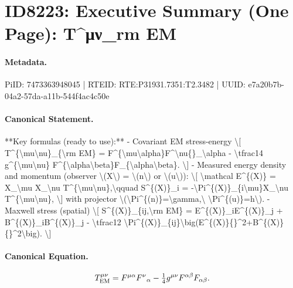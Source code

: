 \section*{ID8223: Executive Summary (One Page): T\textasciicircum{}μν\_rm EM}
\paragraph{Metadata.}
PiID: 7473363948045 | RTEID: RTE:P31931.7351:T2.3482 | UUID: e7a20b7b-04a2-57da-a11b-544f4ac4c50e

\paragraph{Canonical Statement.}
**Key formulas (ready to use):** - Covariant EM stress-energy \textbackslash{}[ T\textasciicircum{}\{\textbackslash{}mu\textbackslash{}nu\}\_\{\textbackslash{}rm EM\} = F\textasciicircum{}\{\textbackslash{}mu\textbackslash{}alpha\}F\textasciicircum{}\textbackslash{}nu\{\}\_\textbackslash{}alpha - \textbackslash{}tfrac14 g\textasciicircum{}\{\textbackslash{}mu\textbackslash{}nu\} F\textasciicircum{}\{\textbackslash{}alpha\textbackslash{}beta\}F\_\{\textbackslash{}alpha\textbackslash{}beta\}. \textbackslash{}] - Measured energy density and momentum (observer \textbackslash{}(X\textbackslash{}) = \textbackslash{}(n\textbackslash{}) or \textbackslash{}(u\textbackslash{})): \textbackslash{}[ \textbackslash{}mathcal E\textasciicircum{}\{(X)\} = X\_\textbackslash{}mu X\_\textbackslash{}nu T\textasciicircum{}\{\textbackslash{}mu\textbackslash{}nu\},\textbackslash{}qquad S\textasciicircum{}\{(X)\}\_i = -\textbackslash{}Pi\textasciicircum{}\{(X)\}\_\{i\textbackslash{}mu\}X\_\textbackslash{}nu T\textasciicircum{}\{\textbackslash{}mu\textbackslash{}nu\}, \textbackslash{}] with projector \textbackslash{}(\textbackslash{}Pi\textasciicircum{}\{(n)\}=\textbackslash{}gamma,\textbackslash{} \textbackslash{}Pi\textasciicircum{}\{(u)\}=h\textbackslash{}). - Maxwell stress (spatial) \textbackslash{}[ S\textasciicircum{}\{(X)\}\_\{ij,\textbackslash{}rm EM\} = E\textasciicircum{}\{(X)\}\_iE\textasciicircum{}\{(X)\}\_j + B\textasciicircum{}\{(X)\}\_iB\textasciicircum{}\{(X)\}\_j - \textbackslash{}tfrac12 \textbackslash{}Pi\textasciicircum{}\{(X)\}\_\{ij\}\textbackslash{}big(E\textasciicircum{}\{(X)\}\{\}\textasciicircum{}2+B\textasciicircum{}\{(X)\}\{\}\textasciicircum{}2\textbackslash{}big). \textbackslash{}]

\paragraph{Canonical Equation.}
\[
T^{\mu\nu}_{\rm EM} = F^{\mu\alpha}F^\nu{}_\alpha - \tfrac14 g^{\mu\nu} F^{\alpha\beta}F_{\alpha\beta}.
\]

